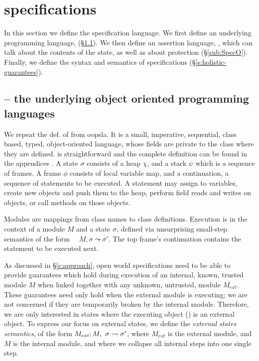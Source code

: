 \section{\SpecLang specifications}
\label{s:semantics}

 
In this section we define {the}  \SpecLang specification language.  
We first define an underlying programming language, \LangOO (\S \ref{sub:Loo}).
We then define an assertion language, \AssertLang, which can talk about the
contents of the state, as well as about protection (\S \ref{sub:SpecO}).  Finally, we define the syntax and
semantics of  \SpecLang
specifications (\S \ref{s:holistic-guarantees}).


\subsection{\LangOO -- the underlying object oriented programming languages}
\label{sub:Loo} 
We repeat the def. of  \LangOO from oopsla. It is a {small}, imperative, sequential, 
class based, typed, object-oriented language, whose
fields are private to the class where they are defined. 
\LangOO is straightforward
{and the complete definition can be found in the appendices %
\cite{necessityFull}.}
 A \LangOO state $\sigma$ consists of a 
heap $\chi$, and a  {stack $\psi$ which is a sequence of frames}.
A frame $\phi$ consists of
local variable map, and a continuation, \ie a sequence of statements to be executed.
 A statement may assign to variables, create new objects and push them to the heap, 
perform field reads and writes on objects,  or
 call methods on those objects. 

 Modules are mappings
from class names to class definitions. 
Execution 
is in the context of  a module $M$ and   a state $\sigma$,
 defined via unsurprising small-step semantics of the form \ \ 
   $M, \sigma \leadsto \sigma'$.
The   top frame's continuation contains the statement to be %
executed next.
 
As discussed in \S \ref{s:approach}, %
{open world specifications need to be able to provide}
guarantees which hold
during execution of an internal, 
known, trusted module $M$ when linked together with any
unknown, untrusted, module $M_{ext}$. These guarantees need only hold 
when the external module is executing; we are not concerned if they are
temporarily broken by the internal module. Therefore, we are only interested in states where the
executing object (\prg{this}) is an external object. 
To express our focus on external states, we define the  \emph{external states semantics}, of the form 
$M_{ext} ; M,\ \sigma \leadsto \sigma'$, where $M_{ext}$ is the external
module, and $M$ is the internal module, and where we
collapse all internal steps into one single step.

